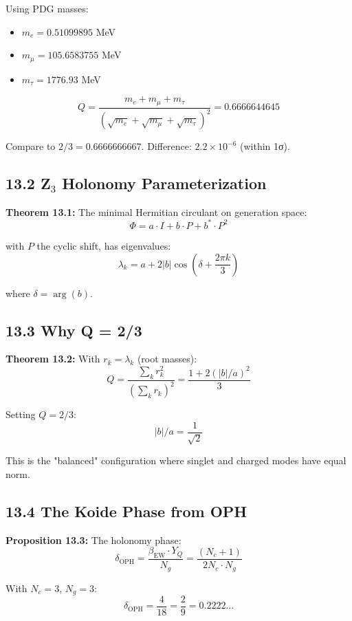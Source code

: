 Using PDG masses:

\begin{itemize}
\tightlist
\item
  \(m_e = 0.51099895\) MeV
\item
  \(m_\mu = 105.6583755\) MeV
\item
  \(m_\tau = 1776.93\) MeV
\end{itemize}

\[Q = \frac{m_e + m_\mu + m_\tau}{(\sqrt{m_e} + \sqrt{m_\mu} + \sqrt{m_\tau})^2} = 0.6666644645\]

Compare to \(2/3 = 0.6666666667\). Difference: \(2.2 \times 10^{-6}\) (within 1σ).

\subsection{13.2 Z$_3$ Holonomy Parameterization}\label{132-zux2083-holonomy-parameterization}

\textbf{Theorem 13.1:} The minimal Hermitian circulant on generation space: \[\Phi = a \cdot I + b \cdot P + b^* \cdot P^2\]

with \(P\) the cyclic shift, has eigenvalues: \[\lambda_k = a + 2|b|\cos\left(\delta + \frac{2\pi k}{3}\right)\]

where \(\delta = \arg(b)\).

\subsection{13.3 Why Q = 2/3}\label{133-why-q--23}

\textbf{Theorem 13.2:} With \(r_k = \lambda_k\) (root masses): \[Q = \frac{\sum_k r_k^2}{(\sum_k r_k)^2} = \frac{1 + 2(|b|/a)^2}{3}\]

Setting \(Q = 2/3\): \[|b|/a = \frac{1}{\sqrt{2}}\]

This is the "balanced" configuration where singlet and charged modes have equal norm.

\subsection{13.4 The Koide Phase from OPH}\label{134-the-koide-phase-from-oph}

\textbf{Proposition 13.3:} The holonomy phase: \[\delta_{\text{OPH}} = \frac{\beta_{\text{EW}} \cdot Y_Q}{N_g} = \frac{(N_c + 1)}{2N_c \cdot N_g}\]

With \(N_c = 3\), \(N_g = 3\): \[\delta_{\text{OPH}} = \frac{4}{18} = \frac{2}{9} = 0.2222...\]

